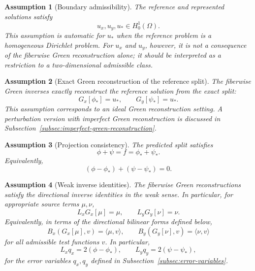 \documentclass[11pt]{article}
\newtheorem{assumption}{Assumption}
\begin{document}
\begin{assumption}[Boundary admissibility]
\label{assumption:boundary-admissibility}
The reference and represented solutions satisfy
\begin{equation}
    u_x,u_y,u_*\in H_0^1(\Omega).
    \label{eq:boundary-admissibility}
\end{equation}
This assumption is automatic for \(u_*\) when the reference problem is a
homogeneous Dirichlet problem.  For \(u_x\) and \(u_y\), however, it is
not a consequence of the fiberwise Green reconstruction alone; it should
be interpreted as a restriction to a two-dimensional admissible class.
\end{assumption}

\begin{assumption}[Exact Green reconstruction of the reference split]
\label{assumption:exact-green-reconstruction}
The fiberwise Green inverses exactly reconstruct the reference solution
from the exact split:
\begin{equation}
    G_x[\phi_*]=u_*,
    \qquad
    G_y[\psi_*]=u_*.
    \label{eq:exact-green-reconstruction}
\end{equation}
This assumption corresponds to an ideal Green reconstruction setting.
A perturbation version with imperfect Green reconstruction is discussed
in Subsection~\ref{subsec:imperfect-green-reconstruction}.
\end{assumption}

\begin{assumption}[Projection consistency]
\label{assumption:projection-consistency}
The predicted split satisfies
\begin{equation}
    \phi+\psi=f=\phi_*+\psi_*.
    \label{eq:projection-consistency}
\end{equation}
Equivalently,
\begin{equation}
    (\phi-\phi_*)+(\psi-\psi_*)=0.
    \label{eq:projection-consistency-error}
\end{equation}
\end{assumption}

\begin{assumption}[Weak inverse identities]
\label{assumption:weak-inverse-identities}
The fiberwise Green reconstructions satisfy the directional inverse
identities in the weak sense.  In particular, for appropriate source
terms \(\mu,\nu\),
\begin{equation}
    L_x G_x[\mu]=\mu,
    \qquad
    L_y G_y[\nu]=\nu.
    \label{eq:weak-inverse-identities}
\end{equation}
Equivalently, in terms of the directional bilinear forms defined below,
\[
    B_x(G_x[\mu],v)=\langle \mu,v\rangle,
    \qquad
    B_y(G_y[\nu],v)=\langle \nu,v\rangle
\]
for all admissible test functions \(v\).  In particular,
\begin{equation}
    L_x q_x = 2(\phi-\phi_*),
    \qquad
    L_y q_y = 2(\psi-\psi_*),
    \label{eq:inverse-identities-for-q}
\end{equation}
for the error variables \(q_x,q_y\) defined in
Subsection~\ref{subsec:error-variables}.
\end{assumption}
\end{document}
